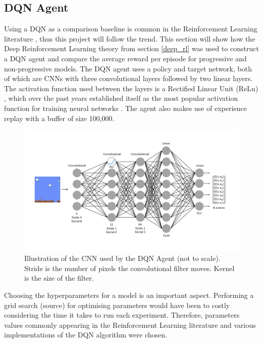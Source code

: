 \documentclass[notitlepage,a4paper,11pt]{article}
\begin{document}
\subsection{DQN Agent}
Using a DQN as a comparison baseline is common in the Reinforcement Learning literature \cite{bacon2017option, kulkarni2016hierarchical, hessel2018rainbow, levy2017learning}, thus this project will follow the trend. This section will show how the Deep Reinforcement Learning theory from section \ref{deep_rl} was used to construct a DQN agent and compare the average reward per episode for progressive and non-progressive models. The DQN agent uses a policy and target network, both of which are CNNs with three convolutional layers followed by two linear layers. The activation function used between the layers is a Rectified Linear Unit (ReLu) \cite{lecun2015deep}, which over the past years established itself as the most popular activation function for training neural networks \cite{ramachandran2017searching}. The agent also makes use of experience replay with a buffer of size 100,000. 

\begin{figure}[!htb]
\vspace{-40pt}
\centering
\includegraphics[trim={0 0 0 0}, clip, width=1\linewidth]{figs/dqn.png}
\vspace{-20pt}
\caption{Illustration of the CNN used by the DQN Agent (not to scale). Stride is the number of pixels the convolutional filter moves. Kernel is the size of the filter.}
\label{fig:dqn_cnn}
\end{figure}

Choosing the hyperparameters for a model is an important aspect. Performing a grid search (source) for optimising parameters would have been to costly considering the time it takes to run each experiment. Therefore, parameters values commonly appearing in the Reinforcement Learning literature and various implementations of the DQN algorithm were chosen.
\end{document}
